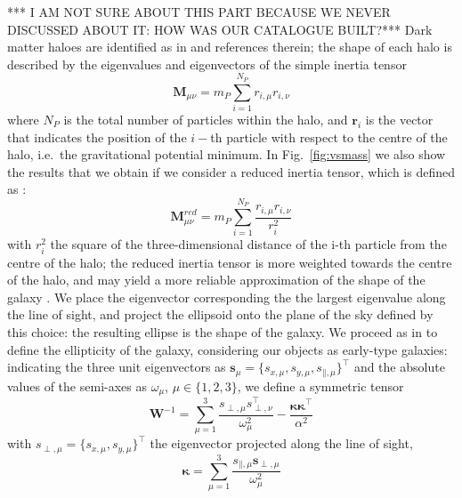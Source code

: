 \documentclass[a4paper,fleqn,usenatbib]{mnras}
\begin{document}
\begin{enumerate}
*** I AM NOT SURE ABOUT THIS PART BECAUSE WE NEVER DISCUSSED ABOUT IT: HOW WAS OUR CATALOGUE BUILT?***
Dark matter haloes are identified as in \citet{Joachimietal2013a} and references therein; the shape of each halo is described by the eigenvalues and eigenvectors of the simple inertia tensor
\begin{equation}
    \mathbf{M}_{\mu \nu} = m_P \sum_{i=1}^{N_P} r_{i, \mu} r_{i, \nu}
	\label{eq:sit}
\end{equation}
where $N_P$ is the total number of particles within the halo, and $\mathbf{r}_{i}$ is the vector that indicates the position of the $i-$th particle with respect to the centre of the halo, i.e.\ the gravitational potential minimum. In Fig.~\ref{fig:vsmass} we also show the results that we obtain if we consider a reduced inertia tensor, which is defined as \citep{Pereiraetal2008}:
\begin{equation}
    \mathbf{M}_{\mu \nu}^{red} = m_P \sum _{i=1}^{N_P} \frac{r_{i, \mu} r_{i, \nu}}{r_i^2}
	\label{eq:rit}
\end{equation}
with $r_i^2$ the square of the three-dimensional distance of the i-th particle from the centre of the halo; the reduced inertia tensor is more weighted towards the centre of the halo, and may yield a more reliable approximation of the shape of the galaxy \citep{Joachimietal2013b, Chisarietal2015}. We place the eigenvector corresponding the the largest eigenvalue along the line of sight, and project the ellipsoid onto the plane of the sky defined by this choice: the resulting ellipse is the shape of the galaxy. We proceed as in \citet{Joachimietal2013a} to define the ellipticity of the galaxy, considering our objects as early-type galaxies: indicating the three unit eigenvectors as $\mathbf{s}_{\mu} = \big \{ s_{x, \mu}, s_{y, \mu}, s_{\mathbin{\|}, \mu}\big \}^\intercal$ and the absolute values of the semi-axes as $\omega_{\mu}$, $\mu \in \{1,2,3\}$, we define a symmetric tensor
\begin{equation}
    \mathbf{W}^{-1} = \sum _{\mu=1}^{3} \frac{s_{\perp, \mu} s^\intercal_{\perp, \nu}}{\omega_{\mu}^2} - \frac{\mathbf{\kappa}\mathbf{\kappa}^{\intercal}}{\alpha^2}
	\label{eq:symtensor}
\end{equation}
with $s_{\perp, \mu} = \big \{ s_{x, \mu}, s_{y, \mu}\big \}^\intercal$ the eigenvector projected along the line of sight, 
\begin{equation}
   \mathbf{\kappa} = \sum_{\mu = 1}^{3} \frac{s_{\mathbin{\|}, \mu} \mathbf{s}_{\perp, \mu}}{\omega_{\mu}^2}
	\label{eq:kappa}
\end{equation}

\end{enumerate}
\end{document}
